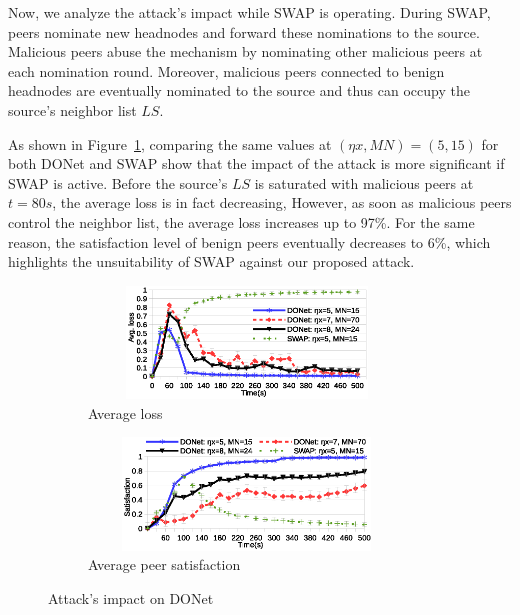 Now, we analyze the attack's impact while SWAP is operating.
During SWAP, peers nominate new headnodes and forward these nominations to the source. 
Malicious peers abuse the mechanism by nominating other malicious peers at each nomination round. 
Moreover, malicious peers connected to benign headnodes are eventually nominated to the source and thus can occupy the source's neighbor list $LS$. 

As shown in Figure~\ref{subfig:avg-loss-donet}, comparing the same values at $(\eta x, MN)=(5, 15)$ for both DONet and SWAP show that the impact of the attack is more significant if SWAP is active.
Before the source's $LS$ is saturated with malicious peers at $t=80s$, the average loss is in fact decreasing, However, as soon as malicious peers control the neighbor list, the average loss increases up to 97\%. 
For the same reason, the satisfaction level of benign peers eventually decreases to 6\%, which highlights the unsuitability of SWAP against our proposed attack.




\begin{figure}[tb]
  \centering
  \begin{subfigure}[c]{0.95\columnwidth}
    \centering
    \includegraphics[width=8.4cm,height=3cm]{./Figures/avg-loss-donet.eps}
    \caption{Average loss}%
    \label{subfig:avg-loss-donet}
  \end{subfigure}
  \begin{subfigure}[c]{0.95\columnwidth}
    \centering
    \includegraphics[width=8.4cm,height=3cm]{./Figures/satisfaction-donet.eps}
    \caption{Average peer satisfaction}%
    \label{subfig:satisfaction-donet}
  \end{subfigure}
  \caption{Attack's impact on DONet}%
  \label{fig:attack-results}
  \vspace{-7mm}
\end{figure}

